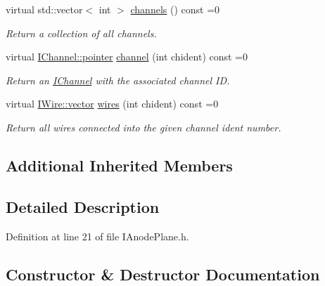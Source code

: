 \begin{DoxyCompactItemize}
virtual std\+::vector$<$ int $>$ \hyperlink{class_wire_cell_1_1_i_anode_plane_a8de1ff56146e343b9ad266eaa011065a}{channels} () const =0
\begin{DoxyCompactList}\small\item\em Return a collection of all channels. \end{DoxyCompactList}\item 
virtual \hyperlink{class_wire_cell_1_1_i_data_aff870b3ae8333cf9265941eef62498bc}{I\+Channel\+::pointer} \hyperlink{class_wire_cell_1_1_i_anode_plane_ab9cab29e958c7cc4aa7dd9cb600c33cd}{channel} (int chident) const =0
\begin{DoxyCompactList}\small\item\em Return an \hyperlink{class_wire_cell_1_1_i_channel}{I\+Channel} with the associated channel ID. \end{DoxyCompactList}\item 
virtual \hyperlink{class_wire_cell_1_1_i_data_ae1a9f863380499bb43f39fabb6276660}{I\+Wire\+::vector} \hyperlink{class_wire_cell_1_1_i_anode_plane_a58f3e7e47cfe10a141e0275f80dcc789}{wires} (int chident) const =0
\begin{DoxyCompactList}\small\item\em Return all wires connected into the given channel ident number. \end{DoxyCompactList}\end{DoxyCompactItemize}
\subsection*{Additional Inherited Members}


\subsection{Detailed Description}


Definition at line 21 of file I\+Anode\+Plane.\+h.



\subsection{Constructor \& Destructor Documentation}
\mbox{\label{class_wire_cell_1_1_i_anode_plane_a480bd95f6ccae8e93edc4476fe34f90b}} 
